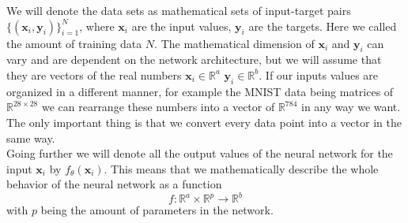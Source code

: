 We will denote the data sets as mathematical sets of input-target pairs $\{(\mathbf{x}_i, \mathbf{y}_i)\}_{i=1}^N$, where $\mathbf{x}_i$ are the input values, $\mathbf{y}_i$ are the targets. Here we called the amount of training data $N$. The mathematical dimension of $\mathbf{x}_i$ and $\mathbf{y}_i$ can vary and are dependent on the network architecture, but we will assume that they are vectors of the real numbers $\mathbf{x}_i \in \mathbb{R}^a$ $\mathbf{y}_i \in \mathbb{R}^b$. If our inputs values are organized in a different manner, for example the MNIST data being matrices of $\mathbb{R}^{28\times28}$ we can rearrange these numbers into a vector of $\mathbb{R}^{784}$ in any way we want. The only important thing is that we convert every data point into a vector in the same way.\\
Going further we will denote all the output values of the neural network for the input $\mathbf{x}_i$ by $f_\theta(\mathbf{x}_i)$. This means that we mathematically describe the whole behavior of the neural network as a function
\begin{equation}
	f: \mathbb{R}^a \times \mathbb{R}^p \rightarrow \mathbb{R}^b
\end{equation}
with $p$ being the amount of parameters in the network.

